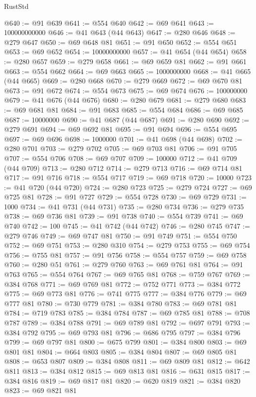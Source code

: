 \begin{lexlean}{RustStd}
\begin{coremodule}
@640 := @91 @639
@641 := @554 @640
@642 := @69 @641
@643 := 100000000000
@646 := @41 @643 (@44 @643)
@647 := @280 @646
@648 := @279 @647
@650 := @69 @648 @81
@651 := @91 @650
@652 := @554 @651
@653 := @69 @652
@654 := 10000000000
@657 := @41 @654 (@44 @654)
@658 := @280 @657
@659 := @279 @658
@661 := @69 @659 @81
@662 := @91 @661
@663 := @554 @662
@664 := @69 @663
@665 := 1000000000
@668 := @41 @665 (@44 @665)
@669 := @280 @668
@670 := @279 @669
@672 := @69 @670 @81
@673 := @91 @672
@674 := @554 @673
@675 := @69 @674
@676 := 100000000
@679 := @41 @676 (@44 @676)
@680 := @280 @679
@681 := @279 @680
@683 := @69 @681 @81
@684 := @91 @683
@685 := @554 @684
@686 := @69 @685
@687 := 10000000
@690 := @41 @687 (@44 @687)
@691 := @280 @690
@692 := @279 @691
@694 := @69 @692 @81
@695 := @91 @694
@696 := @554 @695
@697 := @69 @696
@698 := 1000000
@701 := @41 @698 (@44 @698)
@702 := @280 @701
@703 := @279 @702
@705 := @69 @703 @81
@706 := @91 @705
@707 := @554 @706
@708 := @69 @707
@709 := 100000
@712 := @41 @709 (@44 @709)
@713 := @280 @712
@714 := @279 @713
@716 := @69 @714 @81
@717 := @91 @716
@718 := @554 @717
@719 := @69 @718
@720 := 10000
@723 := @41 @720 (@44 @720)
@724 := @280 @723
@725 := @279 @724
@727 := @69 @725 @81
@728 := @91 @727
@729 := @554 @728
@730 := @69 @729
@731 := 1000
@734 := @41 @731 (@44 @731)
@735 := @280 @734
@736 := @279 @735
@738 := @69 @736 @81
@739 := @91 @738
@740 := @554 @739
@741 := @69 @740
@742 := 100
@745 := @41 @742 (@44 @742)
@746 := @280 @745
@747 := @279 @746
@749 := @69 @747 @81
@750 := @91 @749
@751 := @554 @750
@752 := @69 @751
@753 := @280 @310
@754 := @279 @753
@755 := @69 @754
@756 := @755 @81
@757 := @91 @756
@758 := @554 @757
@759 := @69 @758
@760 := @280 @51
@761 := @279 @760
@763 := @69 @761 @81
@764 := @91 @763
@765 := @554 @764
@767 := @69 @765 @81
@768 := @759 @767
@769 := @384 @768
@771 := @69 @769 @81
@772 := @752 @771
@773 := @384 @772
@775 := @69 @773 @81
@776 := @741 @775
@777 := @384 @776
@779 := @69 @777 @81
@780 := @730 @779
@781 := @384 @780
@783 := @69 @781 @81
@784 := @719 @783
@785 := @384 @784
@787 := @69 @785 @81
@788 := @708 @787
@789 := @384 @788
@791 := @69 @789 @81
@792 := @697 @791
@793 := @384 @792
@795 := @69 @793 @81
@796 := @686 @795
@797 := @384 @796
@799 := @69 @797 @81
@800 := @675 @799
@801 := @384 @800
@803 := @69 @801 @81
@804 := @664 @803
@805 := @384 @804
@807 := @69 @805 @81
@808 := @653 @807
@809 := @384 @808
@811 := @69 @809 @81
@812 := @642 @811
@813 := @384 @812
@815 := @69 @813 @81
@816 := @631 @815
@817 := @384 @816
@819 := @69 @817 @81
@820 := @620 @819
@821 := @384 @820
@823 := @69 @821 @81

\end{coremodule}
\end{lexlean}
